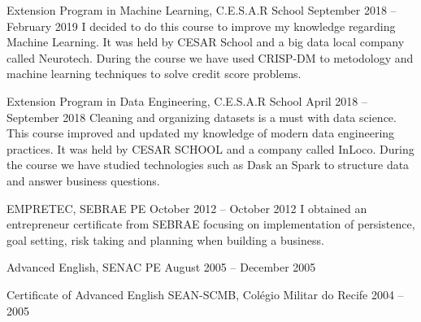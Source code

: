 
\cvmetaevent
{Extension Program in Machine Learning, C.E.S.A.R School}
{September 2018 – February 2019}
{}
{I decided to do this course to improve my knowledge regarding Machine Learning. It was held by CESAR School and a big data local company called Neurotech. During the course we have used CRISP-DM to metodology and machine learning techniques to solve credit score problems.}

\cvmetaevent
{Extension Program in Data Engineering, C.E.S.A.R School}
{April 2018 – September 2018}
{}
{Cleaning and organizing datasets is a must with data science. This course improved and updated my knowledge of modern data engineering practices. It was held by CESAR SCHOOL and a company called InLoco. During the course we have studied technologies such as Dask an Spark to structure data and answer business questions.}

\cvmetaevent
{EMPRETEC, SEBRAE PE}
{October 2012 – October 2012}
{}
{I obtained an entrepreneur certificate from SEBRAE focusing on implementation of persistence, goal setting, risk taking and planning when building a business.}

\cvmetaevent
{Advanced English, SENAC PE}
{August 2005 – December 2005}
{}
{}

\cvmetaevent
{Certificate of Advanced English SEAN-SCMB, Colégio Militar do Recife}
{2004 – 2005}
{}
{}
